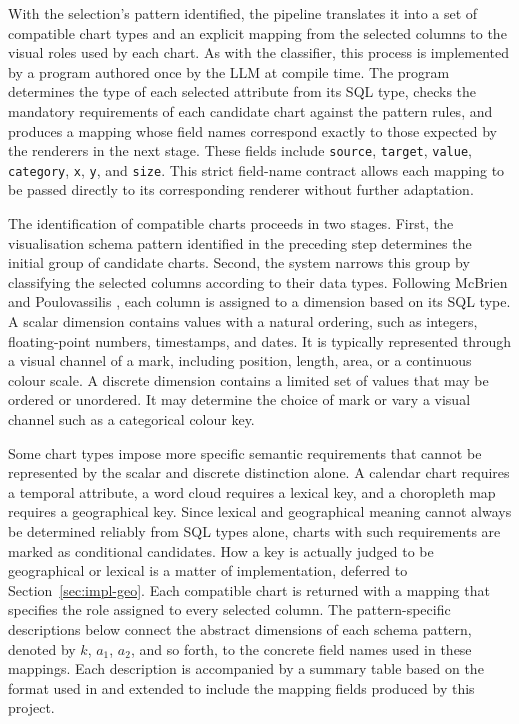 With the selection's pattern identified, the pipeline translates it into a set of compatible chart types and an explicit mapping from the selected columns to the visual roles used by each chart. As with the classifier, this process is implemented by a program authored once by the LLM at compile time. The program determines the type of each selected attribute from its SQL type, checks the mandatory requirements of each candidate chart against the pattern rules, and produces a mapping whose field names correspond exactly to those expected by the renderers in the next stage. These fields include \texttt{source}, \texttt{target}, \texttt{value}, \texttt{category}, \texttt{x}, \texttt{y}, and \texttt{size}. This strict field-name contract allows each mapping to be passed directly to its corresponding renderer without further adaptation.

The identification of compatible charts proceeds in two stages. First, the visualisation schema pattern identified in the preceding step determines the initial group of candidate charts. Second, the system narrows this group by classifying the selected columns according to their data types. Following McBrien and Poulovassilis \cite{brientowards}, each column is assigned to a dimension based on its SQL type. A scalar dimension contains values with a natural ordering, such as integers, floating-point numbers, timestamps, and dates. It is typically represented through a visual channel of a mark, including position, length, area, or a continuous colour scale. A discrete dimension contains a limited set of values that may be ordered or unordered. It may determine the choice of mark or vary a visual channel such as a categorical colour key.

Some chart types impose more specific semantic requirements that cannot be represented by the scalar and discrete distinction alone. A calendar chart requires a temporal attribute, a word cloud requires a lexical key, and a choropleth map requires a geographical key. Since lexical and geographical meaning cannot always be determined reliably from SQL types alone, charts with such requirements are marked as conditional candidates. How a key is actually judged to be geographical or lexical is a matter of implementation, deferred to Section~\ref{sec:impl-geo}. Each compatible chart is returned with a mapping that specifies the role assigned to every selected column. The pattern-specific descriptions below connect the abstract dimensions of each schema pattern, denoted by $k$, $a_1$, $a_2$, and so forth, to the concrete field names used in these mappings. Each description is accompanied by a summary table based on the format used in \cite{brientowards} and extended to include the mapping fields produced by this project.



